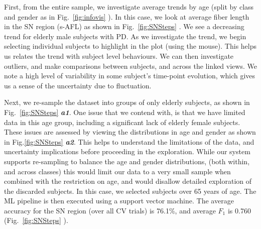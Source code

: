 First, from the entire sample, we investigate average trends by age (split by class and gender as in Fig.~\ref{fig:infovis} ). In this case, we look at average fiber length in the SN region (s-AFL) as shown in Fig.~\ref{fig:SNSteps} . We see a decreasing trend for elderly male subjects with PD. As we investigate the trend, we begin selecting individual subjects to highlight in the plot (using the mouse). This helps us relates the trend with subject level behaviours. We can then investigate outliers, and make comparisons between subjects, and across the linked views. We note a high level of variability in some subject's time-point evolution, which gives us a sense of the uncertainty due to fluctuation.

Next, we re-sample the dataset into groups of only elderly subjects, as shown in Fig.~\ref{fig:SNSteps}  \textbf{\textit{a1}}. One issue that we contend with, is that we have limited data in this age group, including a significant lack of elderly female subjects. These issues are assessed by viewing the distributions in age and gender as shown in Fig.\ref{fig:SNSteps}  \textbf{\textit{a2}}. This helps to understand the limitations of the data, and uncertainty implications before proceeding in the exploration. While our system supports re-sampling to balance the age and gender distributions, (both within, and across classes) this would limit our data to a very small sample when combined with the restriction on age, and would disallow detailed exploration of the discarded subjects. In this case, we selected subjects over 65 years of age. The ML pipeline is then executed using a support vector machine. The average accuracy for the SN region (over all CV trials) is 76.1\%, and average $F_1$ is 0.760 (Fig.~\ref{fig:SNSteps} ). 


